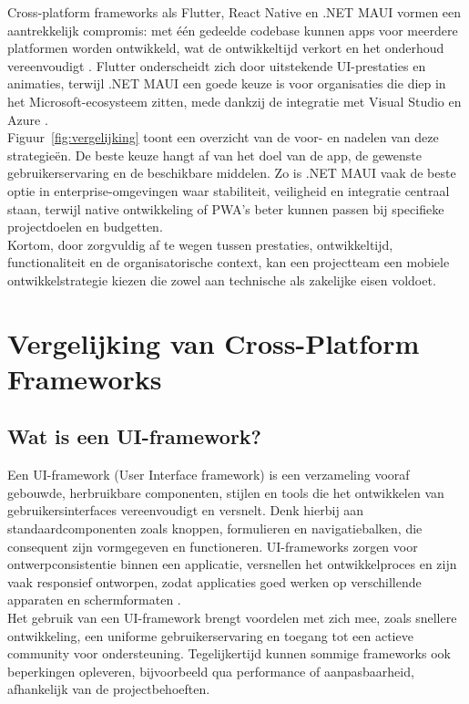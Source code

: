 Cross-platform frameworks als Flutter, React Native en .NET MAUI vormen een aantrekkelijk compromis: met één gedeelde codebase kunnen apps voor meerdere platformen worden ontwikkeld, wat de ontwikkeltijd verkort en het onderhoud vereenvoudigt \autocite{Kuppan2024}. Flutter onderscheidt zich door uitstekende UI-prestaties en animaties, terwijl .NET MAUI een goede keuze is voor organisaties die diep in het Microsoft-ecosysteem zitten, mede dankzij de integratie met Visual Studio en Azure \autocite{Gajjam2025}.\\

Figuur~\ref{fig:vergelijking} toont een overzicht van de voor- en nadelen van deze strategieën. De beste keuze hangt af van het doel van de app, de gewenste gebruikerservaring en de beschikbare middelen. Zo is .NET MAUI vaak de beste optie in enterprise-omgevingen waar stabiliteit, veiligheid en integratie centraal staan, terwijl native ontwikkeling of PWA’s beter kunnen passen bij specifieke projectdoelen en budgetten.\\

Kortom, door zorgvuldig af te wegen tussen prestaties, ontwikkeltijd, functionaliteit en de organisatorische context, kan een projectteam een mobiele ontwikkelstrategie kiezen die zowel aan technische als zakelijke eisen voldoet.\\


\section{Vergelijking van Cross-Platform Frameworks}

\subsection{Wat is een UI-framework?}
Een UI-framework (User Interface framework) is een verzameling vooraf gebouwde, herbruikbare componenten, stijlen en tools die het ontwikkelen van gebruikersinterfaces vereenvoudigt en versnelt. Denk hierbij aan standaardcomponenten zoals knoppen, formulieren en navigatiebalken, die consequent zijn vormgegeven en functioneren. UI-frameworks zorgen voor ontwerpconsistentie binnen een applicatie, versnellen het ontwikkelproces en zijn vaak responsief ontworpen, zodat applicaties goed werken op verschillende apparaten en schermformaten \autocite{Coditation2023}.\\

Het gebruik van een UI-framework brengt voordelen met zich mee, zoals snellere ontwikkeling, een uniforme gebruikerservaring en toegang tot een actieve community voor ondersteuning. Tegelijkertijd kunnen sommige frameworks ook beperkingen opleveren, bijvoorbeeld qua performance of aanpasbaarheid, afhankelijk van de projectbehoeften.\\


